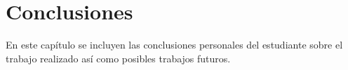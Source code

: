 \chapter{Conclusiones}

En este capítulo se incluyen las conclusiones personales del estudiante sobre el trabajo realizado así como posibles trabajos futuros.

